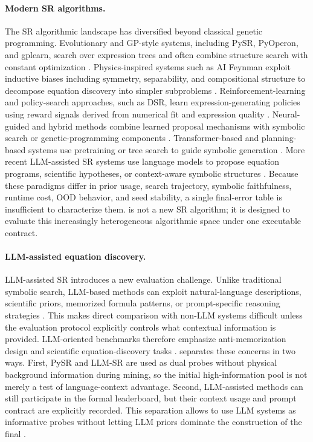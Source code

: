 \paragraph{Modern SR algorithms.}
The SR algorithmic landscape has diversified beyond classical genetic programming. Evolutionary and GP-style systems, including PySR, PyOperon, and gplearn, search over expression trees and often combine structure search with constant optimization \citep{cranmer2023pysr}. Physics-inspired systems such as AI Feynman exploit inductive biases including symmetry, separability, and compositional structure to decompose equation discovery into simpler subproblems \citep{udrescu2020aifeynman}. Reinforcement-learning and policy-search approaches, such as DSR, learn expression-generating policies using reward signals derived from numerical fit and expression quality \citep{petersen2021dsr}. Neural-guided and hybrid methods combine learned proposal mechanisms with symbolic search or genetic-programming components \citep{mundhenk2021dsoseeding}. Transformer-based and planning-based systems use pretraining or tree search to guide symbolic generation \citep{shojaee2023tpsr}. More recent LLM-assisted SR systems use language models to propose equation programs, scientific hypotheses, or context-aware symbolic structures \citep{shojaee2025llmsr}. Because these paradigms differ in prior usage, search trajectory, symbolic faithfulness, runtime cost, OOD behavior, and seed stability, a single final-error table is insufficient to characterize them. \arena{} is not a new SR algorithm; it is designed to evaluate this increasingly heterogeneous algorithmic space under one executable contract.

\paragraph{LLM-assisted equation discovery.}
LLM-assisted SR introduces a new evaluation challenge. Unlike traditional symbolic search, LLM-based methods can exploit natural-language descriptions, scientific priors, memorized formula patterns, or prompt-specific reasoning strategies \citep{shojaee2025llmsr,shojaee2025llmsrbench}. This makes direct comparison with non-LLM systems difficult unless the evaluation protocol explicitly controls what contextual information is provided. LLM-oriented benchmarks therefore emphasize anti-memorization design and scientific equation-discovery tasks \citep{shojaee2025llmsrbench}. \arena{} separates these concerns in two ways. First, PySR and LLM-SR are used as dual probes without physical background information during \candidate{} mining, so the initial high-information pool is not merely a test of language-context advantage. Second, LLM-assisted methods can still participate in the formal leaderboard, but their context usage and prompt contract are explicitly recorded. This separation allows \arena{} to use LLM systems as informative probes without letting LLM priors dominate the construction of the final \core{}.


